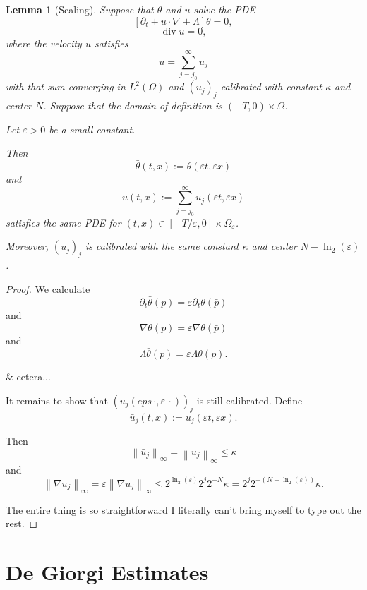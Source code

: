 \documentclass[11pt]{amsart}
\newtheorem{lemma}[theorem]{Lemma}
\theoremstyle{remark}
\theoremstyle{definition}
\newcommand{\eps}{\varepsilon}
\newcommand{\norm}[1]{\left\lVert#1\right\rVert}
\newcommand{\bracket}[1]{\left[ #1 \right]}
\newcommand{\del}{\partial}
\newcommand{\grad}{\nabla}
\renewcommand{\div}{\operatorname{div}}
\begin{document}
\begin{lemma}[Scaling] \label{thm:scaling}
Suppose that $\theta$ and $u$ solve the PDE
\[ \bracket{\del_t + u\cdot\grad + \Lambda} \theta = 0,\]
\[ \div u = 0, \]
where the velocity $u$ satisfies
\[ u = \sum_{j=j_0}^\infty u_j \]
with that sum converging in $L^2(\Omega)$ and $(u_j)_j$ calibrated with constant $\kappa$ and center $N$.  Suppose that the domain of definition is $(-T,0) \times \Omega$.  

Let $\eps>0$ be a small constant. 

Then
\[ \bar{\theta}(t,x) := \theta(\eps t, \eps x) \]
and
\[ \bar{u}(t,x) := \sum_{j=j_0}^\infty u_j(\eps t, \eps x) \]
satisfies the same PDE for $(t,x) \in [-T/\eps, 0]\times \Omega_\eps$.  

Moreover, $(u_j)_j$ is calibrated with the same constant $\kappa$ and center $N - \ln_2(\eps)$.  

\end{lemma}

\begin{proof}
We calculate
\[ \del_t \bar{\theta}(p) = \eps \del_t \theta(\bar{p}) \]
and 
\[ \grad \bar{\theta}(p) = \eps \grad \theta(\bar{p}) \]
and
\[ \Lambda \bar{\theta}(p) = \eps \Lambda \theta(\bar{p}). \]

\& cetera...

It remains to show that $(u_j(eps\,\cdot, \eps\,\cdot))_j$ is still calibrated.  Define
\[ \bar{u}_j(t,x) := u_j(\eps t, \eps x). \]

Then
\[ \norm{\bar{u}_j}_\infty = \norm{u_j}_\infty \leq \kappa \]
and
\[ \norm{\grad \bar{u}_j}_\infty = \eps \norm{\grad u_j}_\infty \leq 2^{\ln_2(\eps)} 2^j 2^{-N} \kappa = 2^j 2^{-(N-\ln_2(\eps))} \kappa. \]

The entire thing is so straightforward I literally can't bring myself to type out the rest.  

\end{proof}




\section{De Giorgi Estimates}
\end{document}
